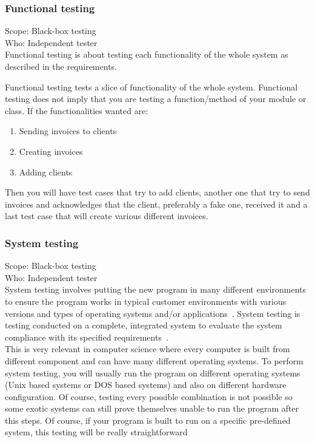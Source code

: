 \documentclass[12pt]{article}
\theoremstyle{definition}
\theoremstyle{definition}
\begin{document}
\subsubsection{Functional testing}

Scope: Black-box testing\\
Who: Independent tester\\

Functional testing is about testing each functionality of the whole system as described in the requirements.

Functional testing tests a slice of functionality of the whole system. Functional testing does not imply that you are testing a function/method of your module or class. If the functionalities wanted are:
\begin{enumerate}
\item Sending invoices to clients
\item Creating invoices
\item Adding clients
\end{enumerate}

Then you will have test cases that try to add clients, another one that try to send invoices and acknowledges that the client, preferably a fake one, received it and a last test case that will create various different invoices.

\subsubsection{System testing}

Scope: Black-box testing\\
Who: Independent tester\\

System testing involves putting the new program in many different environments to ensure the program works in typical customer environments with various versions and types of operating systems and/or applications~\cite{Laurie.W:Black-box}. System testing is testing conducted on a complete, integrated system to evaluate the
system compliance with its specified requirements~\cite{IEEEStd1990}.\\

This is very relevant in computer science where every computer is built from different component and can have many different operating systems. To perform system testing, you will usually run the program on different operating systems (Unix based systems or DOS based systems) and also on different hardware configuration. Of course, testing every possible combination is not possible so some exotic systems can still prove themselves unable to run the program after this steps. Of course, if your program is built to run on a specific pre-defined system, this testing will be really straightforward
\end{document}
